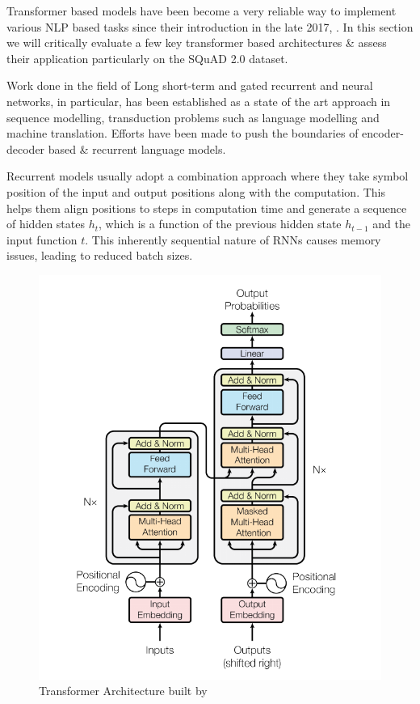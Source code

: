 \documentclass[12pt]{report}
\begin{document}
	        Transformer based models have been become a very reliable way to implement various NLP based tasks since their introduction in the late 2017, \citep{atayl}. In this section we will critically evaluate a few key transformer based architectures \& assess their application particularly on the SQuAD 2.0 dataset.

	        Work done in the field of Long short-term and gated recurrent \citep{lstm} and \citep{recurrent} neural networks, in particular, has been established as a state of the art approach in sequence modelling, transduction problems such as language modelling and machine translation.  Efforts have been made to push the boundaries of encoder-decoder based \& recurrent language models.

	        Recurrent models usually adopt a combination approach where they take symbol position of the input and output positions along with the computation. This helps them align positions to steps in computation time and generate a sequence of hidden states $ h_{t} $, which is a function of the previous hidden state $ h_{t-1}$ and the input function $ t $.  This inherently sequential nature of RNNs causes memory issues, leading to reduced batch sizes. \\
			\begin{figure}[h!]
				\centering
				\includegraphics[scale=0.4]{../images/transformer.png}
				\caption{Transformer Architecture built by \citep{atayl}}\label{transformerArchitecture}
			\end{figure}
\end{document}
